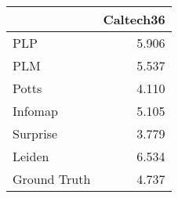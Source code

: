 \begin{tabular}{lr}
\toprule
{} & Caltech36 \\
\midrule
PLP          &     5.906 \\
PLM          &     5.537 \\
Potts        &     4.110 \\
Infomap      &     5.105 \\
Surprise     &     3.779 \\
Leiden       &     6.534 \\
Ground Truth &     4.737 \\
\bottomrule
\end{tabular}
